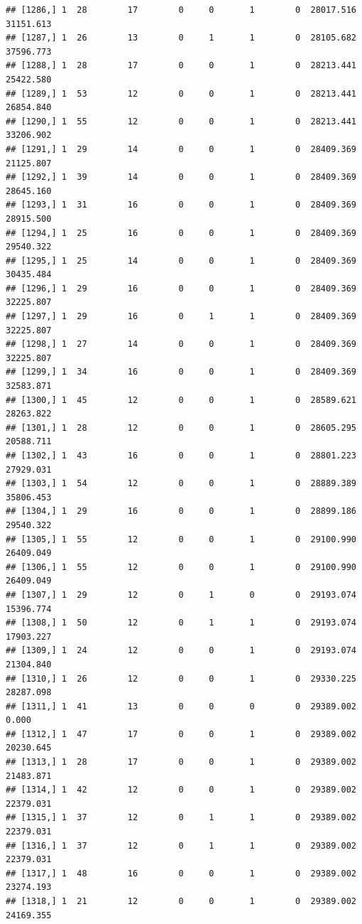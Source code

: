 \documentclass[
]{article}
\begin{document}
\begin{verbatim}
## [1286,] 1  28        17        0     0       1        0  28017.516  31151.613
## [1287,] 1  26        13        0     1       1        0  28105.682  37596.773
## [1288,] 1  28        17        0     0       1        0  28213.441  25422.580
## [1289,] 1  53        12        0     0       1        0  28213.441  26854.840
## [1290,] 1  55        12        0     0       1        0  28213.441  33206.902
## [1291,] 1  29        14        0     0       1        0  28409.369  21125.807
## [1292,] 1  39        14        0     0       1        0  28409.369  28645.160
## [1293,] 1  31        16        0     0       1        0  28409.369  28915.500
## [1294,] 1  25        16        0     0       1        0  28409.369  29540.322
## [1295,] 1  25        14        0     0       1        0  28409.369  30435.484
## [1296,] 1  29        16        0     0       1        0  28409.369  32225.807
## [1297,] 1  29        16        0     1       1        0  28409.369  32225.807
## [1298,] 1  27        14        0     0       1        0  28409.369  32225.807
## [1299,] 1  34        16        0     0       1        0  28409.369  32583.871
## [1300,] 1  45        12        0     0       1        0  28589.621  28263.822
## [1301,] 1  28        12        0     0       1        0  28605.295  20588.711
## [1302,] 1  43        16        0     0       1        0  28801.223  27929.031
## [1303,] 1  54        12        0     0       1        0  28889.389  35806.453
## [1304,] 1  29        16        0     0       1        0  28899.186  29540.322
## [1305,] 1  55        12        0     0       1        0  29100.990  26409.049
## [1306,] 1  55        12        0     0       1        0  29100.990  26409.049
## [1307,] 1  29        12        0     1       0        0  29193.074  15396.774
## [1308,] 1  50        12        0     1       1        0  29193.074  17903.227
## [1309,] 1  24        12        0     0       1        0  29193.074  21304.840
## [1310,] 1  26        12        0     0       1        0  29330.225  28287.098
## [1311,] 1  41        13        0     0       0        0  29389.002      0.000
## [1312,] 1  47        17        0     0       1        0  29389.002  20230.645
## [1313,] 1  28        17        0     0       1        0  29389.002  21483.871
## [1314,] 1  42        12        0     0       1        0  29389.002  22379.031
## [1315,] 1  37        12        0     1       1        0  29389.002  22379.031
## [1316,] 1  37        12        0     1       1        0  29389.002  22379.031
## [1317,] 1  48        16        0     0       1        0  29389.002  23274.193
## [1318,] 1  21        12        0     0       1        0  29389.002  24169.355

\end{verbatim}
\end{document}

